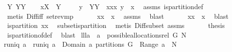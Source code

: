 \begin{isabellebody}
\ {\isacharquery}Y{\isacharequal}{\isachardoublequoteopen}{\isasymUnion}\ YY{\isachardoublequoteclose}\isanewline
\ \ \isamarkupfalse%
\ {\isacharquery}x{\isacharequal}{\isachardoublequoteopen}{\isacharquery}X\ {\isacharminus}\ {\isacharquery}Y{\isachardoublequoteclose}\isanewline
\ \ \isamarkupfalse%
\ {\isachardoublequoteopen}{\isasymforall}\ y\ {\isasymin}\ YY{\isachardot}\ {\isasymforall}\ x{\isasymin}{\isacharquery}xx{\isachardot}\ y\ {\isasyminter}\ x{\isacharequal}{\isacharbraceleft}{\isacharbraceright}{\isachardoublequoteclose}\ \isamarkupfalse%
\ assms\ is{\isacharunderscore}partition{\isacharunderscore}def\ \isamarkupfalse%
\ {\isacharparenleft}metis\ Diff{\isacharunderscore}iff\ set{\isacharunderscore}rev{\isacharunderscore}mp{\isacharparenright}\isanewline
\ \ \isamarkupfalse%
\ \isamarkupfalse%
\ {\isachardoublequoteopen}{\isasymUnion}\ {\isacharquery}xx\ {\isasymsubseteq}\ {\isacharquery}x{\isachardoublequoteclose}\ \isamarkupfalse%
\ assms\ \isamarkupfalse%
\ blast\isanewline
\ \ \isamarkupfalse%
\ \isamarkupfalse%
\ {\isachardoublequoteopen}{\isasymUnion}\ {\isacharquery}xx\ {\isacharequal}\ {\isacharquery}x{\isachardoublequoteclose}\ \isamarkupfalse%
\ blast\isanewline
\ \ \isamarkupfalse%
\ \isamarkupfalse%
\ {\isachardoublequoteopen}is{\isacharunderscore}partition\ {\isacharquery}xx{\isachardoublequoteclose}\ \isamarkupfalse%
\ subset{\isacharunderscore}is{\isacharunderscore}partition\ \isamarkupfalse%
\ {\isacharparenleft}metis\ Diff{\isacharunderscore}subset\ assms{\isacharparenleft}{}{\isacharparenright}{\isacharparenright}\isanewline
\ \ \isamarkupfalse%
\isanewline
\ \ \isamarkupfalse%
\ {\isacharquery}thesis\ \isamarkupfalse%
\ is{\isacharunderscore}partition{\isacharunderscore}of{\isacharunderscore}def\ \isamarkupfalse%
\ blast\isanewline
{}\isamarkupfalse%
%
\endisatagproof
{\isafoldproof}%
%
\isadelimproof
\isanewline
%
\endisadelimproof
\isanewline
{}\isamarkupfalse%
\ lll{}{}a{\isacharcolon}\ \ {\isachardoublequoteopen}a\ {\isasymin}\ possible{\isacharunderscore}allocations{\isacharunderscore}rel\ G\ N{\isachardoublequoteclose}\ \isanewline
{\isachardoublequoteopen}runiq\ a\ {\isacharampersand}\ runiq\ {\isacharparenleft}a{\isasyminverse}{\isacharparenright}\ {\isacharampersand}\ {\isacharparenleft}Domain\ a{\isacharparenright}\ partitions\ G\ {\isacharampersand}\ Range\ a\ {\isasymsubseteq}\ N{\isachardoublequoteclose}\ \isanewline

\end{isabellebody}
